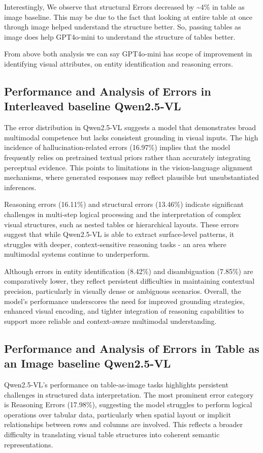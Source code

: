 \documentclass[11pt]{article}
\begin{document}
Interestingly, We observe that structural Errors decreased by \textasciitilde4\% in table as image baseline. This may be due to the fact that looking at entire table at once through image helped understand the structure better. So, passing tables as image does help GPT4o-mini to understand the structure of tables better.

From above both analysis we can say GPT4o-mini has scope of improvement in identifying visual attributes, on entity identification and reasoning errors.

\subsection{Performance and Analysis of Errors in Interleaved baseline Qwen2.5-VL}
The error distribution in Qwen2.5-VL suggests a model that demonstrates broad multimodal competence but lacks consistent grounding in visual inputs. The high incidence of hallucination-related errors (16.97\%) implies that the model frequently relies on pretrained textual priors rather than accurately integrating perceptual evidence. This points to limitations in the vision-language alignment mechanisms, where generated responses may reflect plausible but unsubstantiated inferences.

Reasoning errors (16.11\%) and structural errors (13.46\%) indicate significant challenges in multi-step logical processing and the interpretation of complex visual structures, such as nested tables or hierarchical layouts. These errors suggest that while Qwen2.5-VL is able to extract surface-level patterns, it struggles with deeper, context-sensitive reasoning tasks - an area where multimodal systems continue to underperform.

Although errors in entity identification (8.42\%) and disambiguation (7.85\%) are comparatively lower, they reflect persistent difficulties in maintaining contextual precision, particularly in visually dense or ambiguous scenarios. Overall, the model’s performance underscores the need for improved grounding strategies, enhanced visual encoding, and tighter integration of reasoning capabilities to support more reliable and context-aware multimodal understanding.

\subsection{Performance and Analysis of Errors in Table as an Image baseline Qwen2.5-VL}

Qwen2.5-VL’s performance on table-as-image tasks highlights persistent challenges in structured data interpretation. The most prominent error category is Reasoning Errors (17.98\%), suggesting the model struggles to perform logical operations over tabular data, particularly when spatial layout or implicit relationships between rows and columns are involved. This reflects a broader difficulty in translating visual table structures into coherent semantic representations.
\end{document}
